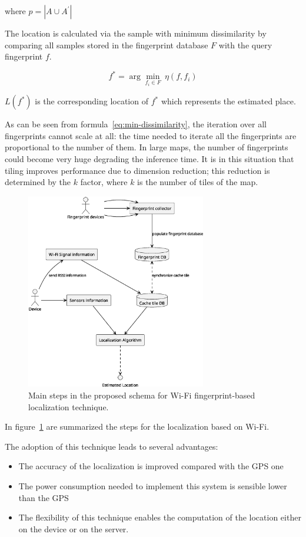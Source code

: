 where $p = | A \cup A^{'} |$

The location is calculated via the sample with minimum dissimilarity by comparing all samples stored in the fingerprint database $F$ with the query
fingerprint $f$.

\begin{equation}
	f^{*} = \arg \min_{f_i \in F} \ \eta(f, f_i)
	\label{eq:min-dissimilarity}
\end{equation}

$L(f^{*})$ is the corresponding location of $f^{*}$ which represents the estimated place.

As can be seen from formula~\ref{eq:min-dissimilarity}, the iteration over all fingerprints cannot scale at all: the time needed to iterate all the
fingerprints are proportional to the number of them. In large maps, the number of fingerprints could become very huge degrading the inference time.
It is in this situation that tiling improves performance due to dimension reduction; this reduction is determined by the $k$ factor, where $k$ is the
number of tiles of the map.

\begin{figure}[H]
	\centering
	\includegraphics[width=0.7\textwidth]{img/fingerprint-schema.eps}
	\caption{Main steps in the proposed schema for Wi-Fi fingerprint-based localization technique.}
	\label{fig:fingerprint-schema}
\end{figure}

In figure~\ref{fig:fingerprint-schema} are summarized the steps for the localization based on Wi-Fi.

The adoption of this technique leads to several advantages:
\begin{itemize}
	\item The accuracy of the localization is improved compared with the GPS one~\cite{du2018hybrid}
	\item The power consumption needed to implement this system is sensible lower than the GPS~\cite{du2018hybrid}
	\item The flexibility of this technique enables the computation of the location either on the device or on the server.
\end{itemize}

